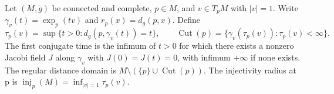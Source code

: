 Let \((M,g)\) be connected and complete, \(p\in M\), and \(v\in T_pM\) with \(|v|=1\). Write \(\gamma_v(t)=\exp_p(tv)\) and \(r_p(x)=d_g(p,x)\). Define
\[
\tau_p(v)=\sup\{t>0:d_g(p,\gamma_v(t))=t\},\qquad
\operatorname{Cut}(p)=\{\gamma_v(\tau_p(v)):\tau_p(v)<\infty\}.
\]
The first conjugate time is the infimum of \(t>0\) for which there exists a nonzero Jacobi field \(J\) along \(\gamma_v\) with \(J(0)=J(t)=0\), with infimum \(+\infty\) if none exists.
The regular distance domain is \(M\setminus(\{p\}\cup\operatorname{Cut}(p))\).
The injectivity radius at p is \(\operatorname{inj}_p(M)=\inf_{|v|=1}\tau_p(v)\).